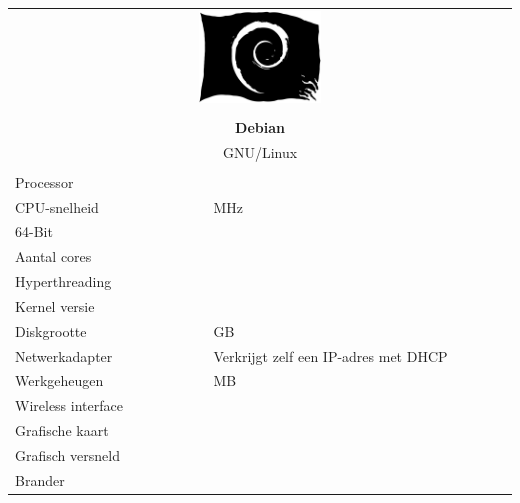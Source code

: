 \documentclass[a4paper,14pt]{extarticle}
\begin{document}

\begin{center}
	\begin{tabular}{ p{4cm} p{4cm}l }
	\multicolumn{3}{c}{\includegraphics[width=0.25\textwidth]{pirateswirl}}       \\
	\multicolumn{3}{c}{}                                                          \\
	\multicolumn{3}{c}{\Huge\bf{Debian \debiancode{} \debianversion}}             \\
	\multicolumn{3}{c}{\LARGE{GNU/Linux}}\\[2em]                                  \\
	Processor          & \multicolumn{2}{l}{\cpumodel{}}                          \\
	CPU-snelheid       & \multicolumn{2}{l}{\cpuspeed{} MHz}                      \\
	64-Bit             & \multicolumn{2}{l}{\bitssixtyfour{}}                     \\
	Aantal cores       & \multicolumn{2}{l}{\corecount{}}                         \\
	Hyperthreading     & \multicolumn{2}{l}{\hyperthreading{}}                    \\
	Kernel versie      & \multicolumn{2}{l}{{}}                     \\
	Diskgrootte        & \multicolumn{2}{l}{\disksize{} GB}                       \\
  Netwerkadapter     & \multicolumn{2}{l}{Verkrijgt zelf een IP-adres met DHCP} \\
	Werkgeheugen       & \multicolumn{2}{l}{\memsize{} MB}                        \\
	Wireless interface & \multicolumn{2}{l}{\wireless{}}                          \\
	Grafische kaart    & \multicolumn{2}{l}{\graphics{}}                          \\
	Grafisch versneld  & \multicolumn{2}{l}{\accelerated{}}                       \\
	Brander            & \multicolumn{2}{l}{\burner{}}                            \\[2em]

\end{tabular}
\end{center}
\end{document}
